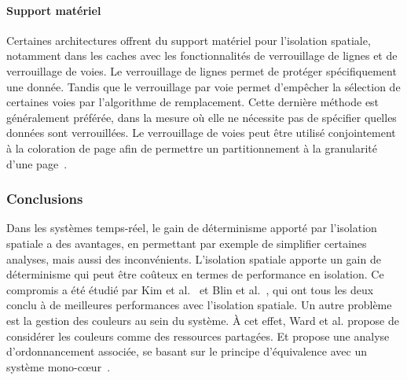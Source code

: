 
\paragraph{Support matériel}

Certaines architectures offrent du support matériel pour l'isolation spatiale, notamment dans les caches avec les fonctionnalités de verrouillage de lignes et de verrouillage de voies.
Le verrouillage de lignes permet de protéger spécifiquement une donnée.
Tandis que le verrouillage par voie permet d'empêcher la sélection de certaines voies par l'algorithme de remplacement.
Cette dernière méthode est généralement préférée, dans la mesure où elle ne nécessite pas de spécifier quelles données sont verrouillées.
Le verrouillage de voies peut être utilisé conjointement à la coloration de page afin de permettre un partitionnement à la granularité d'une page~\cite{mancuso2013real}.

\subsubsection{Conclusions}

Dans les systèmes temps-réel, le gain de déterminisme apporté par l'isolation spatiale a des avantages, en permettant par exemple de simplifier certaines analyses, mais aussi des inconvénients. 
L'isolation spatiale apporte un gain de déterminisme qui peut être coûteux en termes de performance en isolation.
Ce compromis a été étudié par Kim et al.~\cite{kim2017attacking} et Blin et al.~\cite{blin2016maximizing}, qui ont tous les deux conclu à de meilleures performances avec l'isolation spatiale.
Un autre problème est la gestion des couleurs au sein du système.
À cet effet, Ward et al. propose de considérer les couleurs comme des ressources partagées.
Et propose une analyse d'ordonnancement associée, se basant sur le principe d'équivalence avec un système mono-cœur~\cite{ward2013outstanding}.


